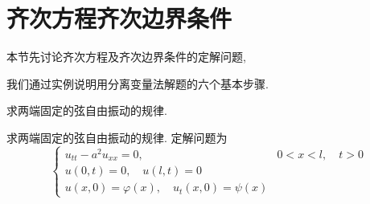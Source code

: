 \section{齐次方程齐次边界条件}
\label{sec:homo}
本节先讨论齐次方程及齐次边界条件的定解问题,


我们通过实例说明用分离变量法解题的六个基本步骤.

\begin{example}
求两端固定的弦自由振动的规律.
\end{example}

求两端固定的弦自由振动的规律.
定解问题为
\begin{equation}
    \begin{cases}u_{t t}-a^{2} u_{x x}=0, & 0<x<l, \quad t>0 
        \\ u(0, t)=0, \quad u(l, t)=0 & 
        \\ u(x, 0)=\varphi(x), \quad u_{t}(x, 0)=\psi(x) & 
    \end{cases}
    \label{eq:string_vibration_equation}
\end{equation}

